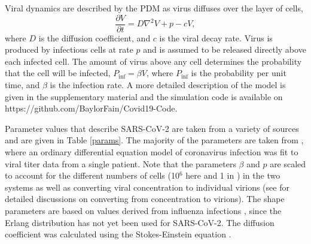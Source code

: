 Viral dynamics are described by the PDM as virus diffuses over the layer of cells,
\begin{equation}
\frac{\partial V}{\partial t} = D\nabla^2V+p-cV,
\end{equation}
where $D$ is the diffusion coefficient, and $c$ is the viral decay rate. Virus is produced by infectious cells at rate $p$ and is assumed to be released directly above each infected cell. The amount of virus above any cell determines the probability that the cell will be infected, $P_\mathrm{inf}=\beta V$, where $P_\mathrm{inf}$ is the probability per unit time, and $\beta$ is the infection rate. A more detailed description of the model is given in the supplementary material and the simulation code is available on https://github.com/BaylorFain/Covid19-Code.

Parameter values that describe SARS-CoV-2 are taken from a variety of sources and are given in Table \ref{params}. The majority of the parameters are taken from \citep{pinky20}, where an ordinary differential equation model of coronavirus infection was fit to viral titer data from a single patient. Note that the parameters $\beta$ and $p$ are scaled to account for the different numbers of cells (10$^6$ here and 1 in \citep{pinky20}) in the two systems as well as converting viral concentration to individual virions (see \citep{handel07,perelson12,dobrovolny17} for detailed discussions on converting from concentration to virions). The shape parameters are based on values derived from influenza infections \citep{pinilla12}, since the Erlang distribution has not yet been used for SARS-CoV-2. The diffusion coefficient was calculated using the Stokes-Einstein equation \citep{cush97}. 
